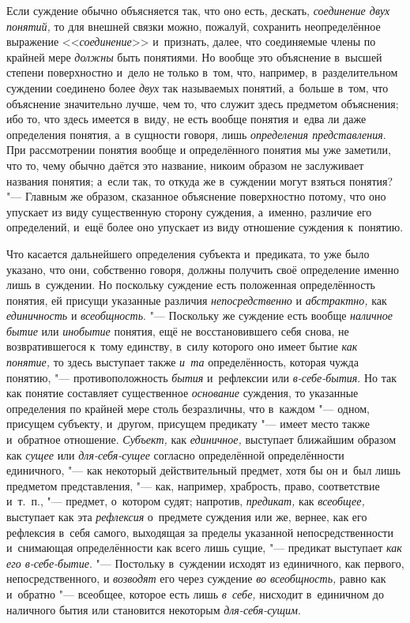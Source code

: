 Если суждение обычно объясняется так, что оно есть, дескать,
{\em соединение двух понятий,} то для внешней связки можно, пожалуй, сохранить
неопределённое выражение <<{\em соединение}>> и~признать, далее, что
соединяемые члены по крайней мере {\em должны} быть понятиями. Но вообще это
объяснение в~высшей степени поверхностно и~дело не только в~том, что, например,
в~разделительном суждении соединено более {\em двух} так называемых
понятий, а~больше в~том, что объяснение значительно лучше, чем то, что
служит здесь предметом объяснения; ибо то, что здесь имеется в~виду, не
есть вообще понятия и~едва ли даже определения понятия, а~в сущности говоря,
лишь {\em определения представления}. При рассмотрении понятия вообще и
определённого понятия мы уже заметили, что то, чему обычно даётся это
название, никоим образом не заслуживает названия понятия; а~если так, то
откуда же в~суждении могут взяться понятия? "--- Главным же
образом, сказанное объяснение поверхностно потому, что оно упускает из виду
существенную сторону суждения, а~именно, различие его определений, и~ещё
более оно упускает из виду отношение суждения к~понятию.

Что касается дальнейшего определения субъекта и~предиката, то
уже было указано, что они, собственно говоря, должны получить своё
определение именно лишь в~суждении. Но поскольку суждение есть положенная
определённость понятия, ей присущи указанные различия
{\em непосредственно} и {\em абстрактно,} как {\em единичность}
и {\em всеобщность}. "--- Поскольку же суждение есть вообще
{\em наличное бытие} или {\em инобытие} понятия, ещё не восстановившего себя
снова, не возвратившегося к~тому единству, в~силу которого оно имеет бытие
{\em как понятие,} то здесь выступает также {\em и~та} определённость, которая
чужда понятию, "--- противоположность {\em бытия} и~рефлексии или
{\em в-себе-бытия}. Но так как понятие составляет существенное {\em основание}
суждения, то указанные определения по крайней мере столь безразличны, что
в~каждом "--- одном, присущем субъекту, и~другом, присущем предикату "---
имеет место также и~обратное отношение. {\em Субъект,} как {\em единичное,}
выступает ближайшим образом как {\em сущее} или {\em для-себя-сущее}
согласно определённой определённости единичного, "---
как некоторый действительный предмет, хотя бы он и~был лишь
предметом представления, "--- как, например, храбрость, право,
соответствие и~т.~п., "--- предмет, о~котором судят; напротив,
{\em предикат,} как {\em всеобщее,} выступает как эта {\em рефлексия}
о~предмете суждения или же, вернее, как его рефлексия в~себя самого,
выходящая за пределы указанной непосредственности и~снимающая определённости
как всего лишь сущие, "--- предикат выступает {\em как его в-себе-бытие}. "---
Постольку в~суждении исходят из единичного, как первого, непосредственного, и
{\em возводят} его через суждение {\em во всеобщность,} равно как и~обратно
"--- всеобщее, которое есть лишь {\em в~себе,} нисходит в~единичном до
наличного бытия или становится некоторым {\em для-себя-сущим}.

